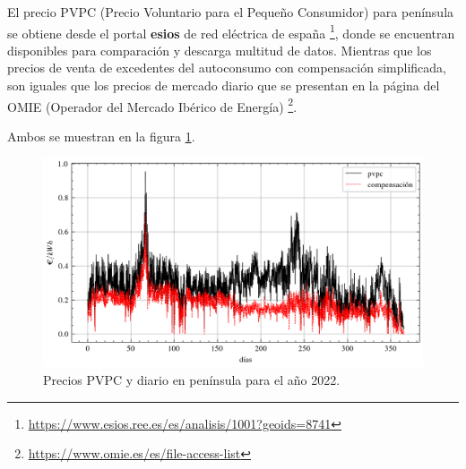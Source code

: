 El precio PVPC (Precio Voluntario para el Pequeño Consumidor) para península se
obtiene desde el portal \textbf{esios} de red eléctrica de españa
\footnote{\url{https://www.esios.ree.es/es/analisis/1001?geoids=8741}}, donde
se encuentran disponibles para comparación y descarga multitud de datos.
Mientras que los precios de venta de excedentes del autoconsumo con
compensación simplificada, son iguales que los precios de mercado diario que se
presentan en la página del OMIE (Operador del Mercado Ibérico de Energía)
\footnote{\url{https://www.omie.es/es/file-access-list}}.

Ambos se muestran en la figura \ref{fig:prices_year}.

\begin{figure}[h] \centering
	\centering
	\includegraphics[width=1\textwidth]{./capitulos/adquisicion_de_datos/images/prices_year.png}
	\caption{Precios PVPC y diario en península para el año 2022.}
	\label{fig:prices_year}
\end{figure}
